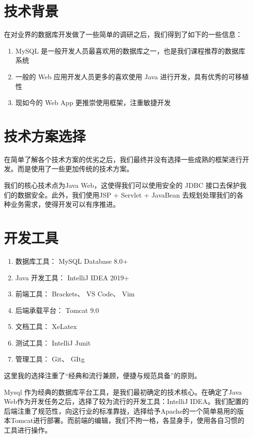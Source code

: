 \documentclass[../report.tex]{subfiles}
\begin{document}
\section{技术背景}

在对业界的数据库开发做了一些简单的调研之后，我们得到了如下的一些信息：

\begin{enumerate}
\itemsep -0.3em
\item MySQL 是一般开发人员最喜欢用的数据库之一，也是我们课程推荐的数据库系统
\item 一般的 Web 应用开发人员更多的喜欢使用 Java 进行开发，具有优秀的可移植性
\item 现如今的 Web App 更推崇使用框架，注重敏捷开发
\end{enumerate}

\section {技术方案选择}

在简单了解各个技术方案的优劣之后，我们最终并没有选择一些成熟的框架进行开发。而是使用了一些更加传统的技术方案。

我们的核心技术点为Java Web，这使得我们可以使用安全的 JDBC 接口去保护我们的数据安全。此外，我们使用JSP + Servlet + JavaBean 去规划处理我们的各种业务需求，使得开发可以有序推进。

\section{开发工具}

\begin{enumerate}
\itemsep -0.3em
\item 数据库工具： MySQL Database 8.0+
\item Java 开发工具： IntelliJ IDEA 2019+
\item 前端工具： Brackets、 VS Code、 Vim
\item 后端承载平台： Tomcat 9.0
\item 文档工具： XeLatex
\item 测试工具： IntelliJ Junit
\item 管理工具： Git、 GItg
\end{enumerate}

这里我的选择注重了“经典和流行兼顾，便捷与规范具备”的原则。

Mysql 作为经典的数据库平台工具，是我们最初确定的技术核心。在确定了Java Web作为开发任务之后，选择了较为流行的开发工具：IntelliJ IDEA。我们配置的后端注重了规范性，向这行业的标准靠拢，选择给予Apache的一个简单易用的版本Tomcat进行部署。而前端的编辑，我们不拘一格，各显身手，使用各自习惯的工具进行操作。
\end{document}
